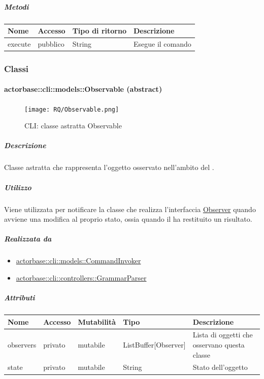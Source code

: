 \documentclass{scalatekids-article}
\begin{document}
\subparagraph{Metodi}

\begin{tabular}{| p{3cm} | p{1.5cm} | p{3.5cm} | p{9cm} |}
  \hline
  Nome & Accesso & Tipo di ritorno & Descrizione\\
  \hline
  execute & pubblico & String & Esegue il comando\\
  \hline
\end{tabular}

\subsubsection{Classi}
\paragraph{actorbase::cli::models::Observable (abstract)}
\label{sec:actorbase::cli::models::Observable}

\begin{figure}[H]
  \begin{center}
    \texttt{[image: RQ/Observable.png]}
    \caption{CLI: classe astratta Observable}
  \end{center}
\end{figure}

\subparagraph{Descrizione}
Classe astratta che rappresenta l'oggetto osservato nell'ambito del  .

\subparagraph{Utilizzo}

Viene utilizzata per notificare la classe che realizza l'interfaccia \hyperref[sec:actorbase::cli::views::Observer]{Observer}
quando avviene una modifica al proprio stato, ossia quando il 
ha restituito un risultato.

\subparagraph{Realizzata da}
\begin{itemize}
\item \hyperref[sec:actorbase::cli::models::CommandInvoker]{actorbase::cli::models::CommandInvoker}
\item \hyperref[sec:actorbase::cli::controllers::GrammarParser]{actorbase::cli::controllers::GrammarParser}
\end{itemize}

\subparagraph{Attributi}

\begin{tabular}{| p{1.5cm} | p{1.5cm} | p{2cm} | p{3.5cm} | p{8.5cm} |}
  \hline
  Nome & Accesso & Mutabilità & Tipo & Descrizione\\
  \hline
  observers & privato & mutabile & ListBuffer[Observer] & Lista di oggetti che osservano questa classe\\
  \hline
  state & privato & mutabile & String & Stato dell'oggetto\\
  \hline
\end{tabular}
\end{document}
